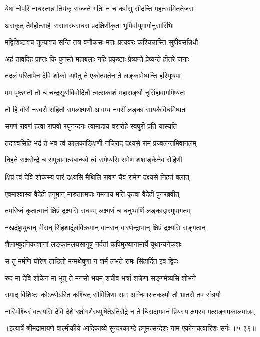\twolineshloka
{येषां नोपरि नाधस्तान्न तिर्यक् सज्जते गतिः}
{न च कर्मसु सीदन्ति महत्स्वमिततेजसः} %

\twolineshloka
{असकृत् तैर्महोत्साहैः ससागरधराधरा}
{प्रदक्षिणीकृता भूमिर्वायुमार्गानुसारिभिः} %

\twolineshloka
{मद्विशिष्टाश्च तुल्याश्च सन्ति तत्र वनौकसः}
{मत्तः प्रत्यवरः कश्चिन्नास्ति सुग्रीवसन्निधौ} %

\twolineshloka
{अहं तावदिह प्राप्तः किं पुनस्ते महाबलाः}
{नहि प्रकृष्टाः प्रेष्यन्ते प्रेष्यन्ते हीतरे जनाः} %

\twolineshloka
{तदलं परितापेन देवि शोको व्यपैतु ते}
{एकोत्पातेन ते लङ्कामेष्यन्ति हरियूथपाः} %

\twolineshloka
{मम पृष्ठगतौ तौ च चन्द्रसूर्याविवोदितौ}
{त्वत्सकाशं महासङ्घौ नृसिंहावागमिष्यतः} %

\twolineshloka
{तौ हि वीरौ नरवरौ सहितौ रामलक्ष्मणौ}
{आगम्य नगरीं लङ्कां सायकैर्विधमिष्यतः} %

\twolineshloka
{सगणं रावणं हत्वा राघवो रघुनन्दनः}
{त्वामादाय वरारोहे स्वपुरीं प्रति यास्यति} %

\twolineshloka
{तदाश्वसिहि भद्रं ते भव त्वं कालकाङ्क्षिणी}
{नचिराद् द्रक्ष्यसे रामं प्रज्वलन्तमिवानलम्} %

\twolineshloka
{निहते राक्षसेन्द्रे च सपुत्रामात्यबान्धवे}
{त्वं समेष्यसि रामेण शशाङ्केनेव रोहिणी} %

\twolineshloka
{क्षिप्रं त्वं देवि शोकस्य पारं द्रक्ष्यसि मैथिलि}
{रावणं चैव रामेण द्रक्ष्यसे निहतं बलात्} %

\twolineshloka
{एवमाश्वास्य वैदेहीं हनूमान् मारुतात्मजः}
{गमनाय मतिं कृत्वा वैदेहीं पुनरब्रवीत्} %

\twolineshloka
{तमरिघ्नं कृतात्मानं क्षिप्रं द्रक्ष्यसि राघवम्}
{लक्ष्मणं च धनुष्पाणिं लङ्काद्वारमुपागतम्} %

\twolineshloka
{नखदंष्ट्रायुधान् वीरान् सिंहशार्दूलविक्रमान्}
{वानरान् वारणेन्द्राभान् क्षिप्रं द्रक्ष्यसि सङ्गतान्} %

\twolineshloka
{शैलाम्बुदनिकाशानां लङ्कामलयसानुषु}
{नर्दतां कपिमुख्यानामार्ये यूथान्यनेकशः} %

\twolineshloka
{स तु मर्मणि घोरेण ताडितो मन्मथेषुणा}
{न शर्म लभते रामः सिंहार्दित इव द्विपः} %

\twolineshloka
{रुद मा देवि शोकेन मा भूत् ते मनसो भयम्}
{शचीव भर्त्रा शक्रेण सङ्गमेष्यसि शोभने} %

\twolineshloka
{रामाद् विशिष्टः कोऽन्योऽस्ति कश्चित् सौमित्रिणा समः}
{अग्निमारुतकल्पौ तौ भ्रातरौ तव संश्रयौ} %

\twolineshloka
{नास्मिंश्चिरं वत्स्यसि देवि देशे रक्षोगणैरध्युषितेऽतिरौद्रे}
{न ते चिरादागमनं प्रियस्य क्षमस्व मत्सङ्गमकालमात्रम्} %


॥इत्यार्षे श्रीमद्रामायणे वाल्मीकीये आदिकाव्ये सुन्दरकाण्डे हनूमत्सन्देशः नाम एकोनचत्वारिंशः सर्गः ॥५-३९॥
